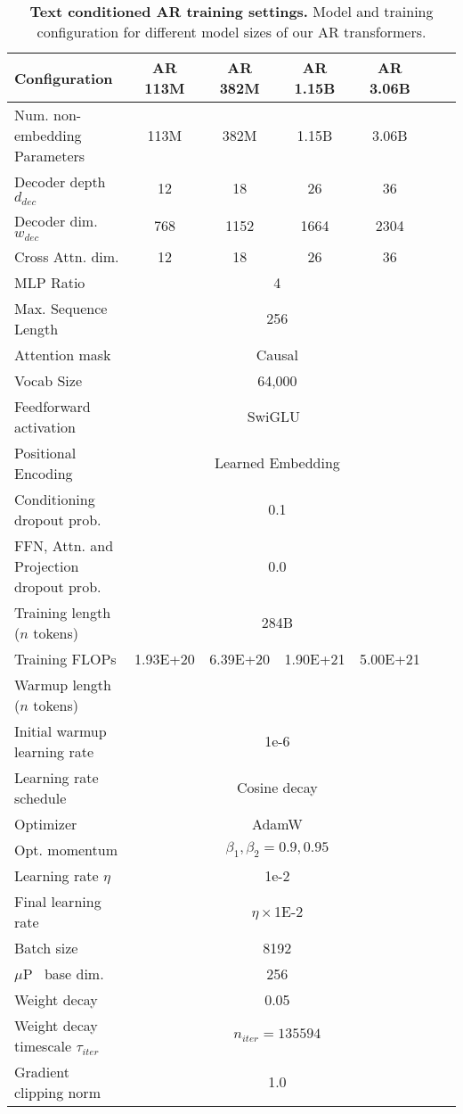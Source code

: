 \begin{table}[h!]
    \caption{\textbf{Text conditioned AR training settings.} Model and training configuration for different model sizes of our AR transformers.}
    \label{tab:app_t2i_ar_training_settings}
    \centering
    \begin{adjustbox}{max width=\linewidth}
    \begin{tabular}{@{}l|cccccc@{}}
    \toprule
    Configuration & AR 113M & AR 382M & AR 1.15B & AR 3.06B \\ 
    
    \midrule
    Num. non-embedding Parameters & 113M & 382M & 1.15B & 3.06B \\
    Decoder depth $d_{dec}$ & 12 & 18 & 26 & 36 \\
    Decoder dim. $w_{dec}$ & 768 & 1152 & 1664 & 2304 \\
    Cross Attn. dim. & 12 & 18 & 26 & 36 \\
    MLP Ratio & \multicolumn{4}{c}{4} \\
    Max. Sequence Length & \multicolumn{4}{c}{256} \\ 
    Attention mask & \multicolumn{4}{c}{Causal} \\ 
    Vocab Size & \multicolumn{4}{c}{64,000} \\ 
    Feedforward activation & \multicolumn{4}{c}{SwiGLU~\cite{Shazeer2020GLU}} \\
    Positional Encoding & \multicolumn{4}{c}{Learned Embedding} \\
    Conditioning dropout prob. & \multicolumn{4}{c}{0.1} \\
    FFN, Attn. and Projection dropout prob. & \multicolumn{4}{c}{0.0} \\

    \midrule
    Training length ($n$ tokens) & \multicolumn{4}{c}{284B} \\
    Training FLOPs & 1.93E+20 & 6.39E+20 & 1.90E+21 & 5.00E+21 \\
    Warmup length ($n$ tokens) &  &  &  &  \\
    Initial warmup learning rate & \multicolumn{4}{c}{1e-6} \\
    Learning rate schedule & \multicolumn{4}{c}{Cosine decay} \\
    Optimizer & \multicolumn{4}{c}{AdamW \cite{Loshchilov2017AdamW}} \\
    Opt. momentum & \multicolumn{4}{c}{$\beta_1,\beta_2=0.9,0.95$} \\
    Learning rate $\eta$ & \multicolumn{4}{c}{1e-2}\\
    Final learning rate & \multicolumn{4}{c}{$\eta \times$1E-2} \\
    Batch size & \multicolumn{4}{c}{8192} \\
    $\mu$P~\cite{Yang2022muP} base dim. & \multicolumn{4}{c}{256} \\
    Weight decay & \multicolumn{4}{c}{0.05} \\
    Weight decay timescale $\tau_{iter}$~\cite{Wang2024AdamWWDEMA} & \multicolumn{4}{c}{$n_{iter} = \num{135594}$} \\
    Gradient clipping norm & \multicolumn{4}{c}{1.0} \\
    

\end{tabular}
\end{adjustbox}
\end{table}
